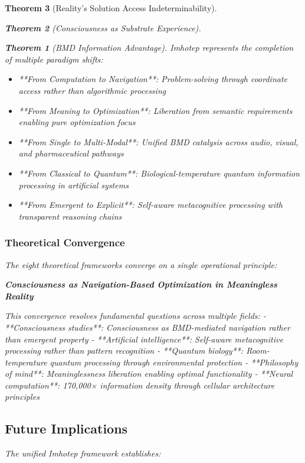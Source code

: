 \documentclass[12pt,a4paper]{article}
\newtheorem{theorem}{Theorem}[section]
\theoremstyle{remark}
\begin{document}
\begin{theorem}[Reality's Solution Access Indeterminability]
\begin{theorem}[Consciousness as Substrate Experience]
\begin{theorem}[BMD Information Advantage]
{{{Imhotep represents the completion of multiple paradigm shifts:

\begin{itemize}
\item **From Computation to Navigation**: Problem-solving through coordinate access rather than algorithmic processing
\item **From Meaning to Optimization**: Liberation from semantic requirements enabling pure optimization focus
\item **From Single to Multi-Modal**: Unified BMD catalysis across audio, visual, and pharmaceutical pathways
\item **From Classical to Quantum**: Biological-temperature quantum information processing in artificial systems
\item **From Emergent to Explicit**: Self-aware metacognitive processing with transparent reasoning chains
\end{itemize}

\subsubsection{Theoretical Convergence}

The eight theoretical frameworks converge on a single operational principle:

\textbf{Consciousness as Navigation-Based Optimization in Meaningless Reality}

This convergence resolves fundamental questions across multiple fields:
- **Consciousness studies**: Consciousness as BMD-mediated navigation rather than emergent property
- **Artificial intelligence**: Self-aware metacognitive processing rather than pattern recognition
- **Quantum biology**: Room-temperature quantum processing through environmental protection
- **Philosophy of mind**: Meaninglessness liberation enabling optimal functionality
- **Neural computation**: 170,000× information density through cellular architecture principles

\subsection{Future Implications}

The unified Imhotep framework establishes:

}}}
\end{theorem}
\end{theorem}
\end{theorem}
\end{document}
